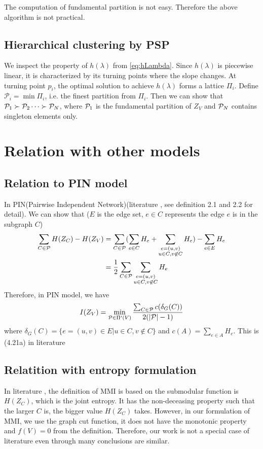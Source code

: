 \documentclass{article}
\begin{document}
The computation of fundamental partition is not easy. Therefore the above algorithm is not practical.

\subsection{Hierarchical clustering by PSP}
We inspect the property of $h(\lambda)$ from \eqref{eq:hLambda}. Since $h(\lambda)$ is piecewise linear, it is characterized by its turning points where the slope changes.
At turning point $p_i$, the optimal solution to achieve $h(\lambda)$ forms a lattice $\Pi_i$.
Define $\mathcal{P}_i = \min \Pi_i$, i.e. the finest partition from $\Pi_i$. Then we can show that
$\P_1 \succ \P_2 \dots \succ \P_N$, where $\P_1$ is the fundamental partition of $Z_V$ and $\P_N$ contains singleton elements only.

\section{Relation with other models}
\subsection{Relation to PIN model}
In PIN(Pairwise Independent Network)(literature \cite{pin}, see definition 2.1 and 2.2 for detail).
We can show that ($E$ is the edge set, $e \in C$ represents the edge $e$ is in the subgraph $C$)
\begin{align*}
\sum_{C \in \P} H(Z_C) - H(Z_V) & = \sum_{C \in \P} (\sum_{e \in C} H_e + \sum_{\substack{e = (u,v) \\ u \in C, v\not\in C }} H_e) - \sum_{e \in E} H_e \\
& = {1 \over 2}\sum_{C \in \P}  \sum_{\substack{e = (u,v) \\ u \in C, v\not\in C }} H_e
\end{align*}
Therefore, in PIN model, we have
\begin{equation}
I(Z_V) = \min_{ \P \in \Pi'(V)} \frac{ \sum_{C \in \P} c(\delta_{G}(C))}{2(\abs{\P} - 1 )}
\end{equation}
where $\delta_{G}(C) = \{e = (u, v) \in E | u \in C, v \not\in C\} $ and $c(A) = \sum_{e\in A} H_e$.
This is (4.21a) in literature \cite{ic}
\subsection{Relatition with entropy formulation}
In literature \cite{ic}, the definition of MMI is based on the submodular function is $H(Z_C)$, which is the joint entropy. It has the non-deceasing property such that the larger $C$ is, the bigger value $H(Z_C)$ takes. However, in our formulation of MMI, we use the graph cut function, it does not have the monotonic property and $f(V) = 0$ from the definition. Therefore, our work is not a special case of literature \cite{ic} even through many conclusions are similar.
\end{document}
